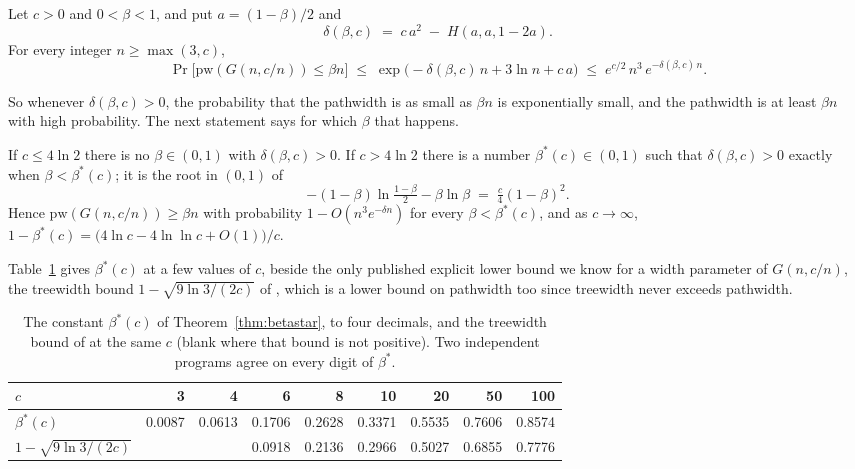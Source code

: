 \begin{theorem}
\label{thm:firstmoment}
Let $c>0$ and $0<\beta<1$, and put $a=(1-\beta)/2$ and
\[
  \delta(\beta,c) \;=\; c\,a^{2} \;-\; H(a,a,1-2a).
\]
For every integer $n\ge\max(3,c)$,
\[
  \Pr\bigl[\mathrm{pw}(G(n,c/n))\le\beta n\bigr]
  \;\le\; \exp\bigl(-\delta(\beta,c)\,n+3\ln n+c\,a\bigr)
  \;\le\; e^{c/2}\,n^{3}\,e^{-\delta(\beta,c)\,n}.
\]
\end{theorem}

So whenever $\delta(\beta,c)>0$, the probability that the pathwidth is as small
as $\beta n$ is exponentially small, and the pathwidth is at least $\beta n$
with high probability. The next statement says for which $\beta$ that happens.

\begin{theorem}
\label{thm:betastar}
If $c\le4\ln2$ there is no $\beta\in(0,1)$ with $\delta(\beta,c)>0$. If
$c>4\ln2$ there is a number $\beta^{*}(c)\in(0,1)$ such that
$\delta(\beta,c)>0$ exactly when $\beta<\beta^{*}(c)$; it is the root in
$(0,1)$ of
\[
  -(1-\beta)\ln\tfrac{1-\beta}{2}-\beta\ln\beta \;=\; \tfrac{c}{4}(1-\beta)^{2}.
\]
Hence $\mathrm{pw}(G(n,c/n))\ge\beta n$ with probability $1-O(n^{3}e^{-\delta n})$
for every $\beta<\beta^{*}(c)$, and as $c\to\infty$,
$1-\beta^{*}(c)=\bigl(4\ln c-4\ln\ln c+O(1)\bigr)/c$.
\end{theorem}

Table~\ref{tab:betastar} gives $\beta^{*}(c)$ at a few values of $c$, beside the
only published explicit lower bound we know for a width parameter of
$G(n,c/n)$, the treewidth bound $1-\sqrt{9\ln3/(2c)}$ of
\citet{PerarnauSerra2014}, which is a lower bound on pathwidth too since
treewidth never exceeds pathwidth.

\begin{table}[htbp]
\centering
\caption{The constant $\beta^{*}(c)$ of Theorem~\ref{thm:betastar}, to four
decimals, and the treewidth bound of \citet{PerarnauSerra2014} at the same
$c$ (blank where that bound is not positive). Two independent programs agree
on every digit of $\beta^{*}$.}
\label{tab:betastar}
\begin{tabular}{@{}lrrrrrrrr@{}}
\toprule
$c$ & 3 & 4 & 6 & 8 & 10 & 20 & 50 & 100 \\
\midrule
$\beta^{*}(c)$ & 0.0087 & 0.0613 & 0.1706 & 0.2628 & 0.3371 & 0.5535 & 0.7606 & 0.8574 \\
$1-\sqrt{9\ln3/(2c)}$ & & & 0.0918 & 0.2136 & 0.2966 & 0.5027 & 0.6855 & 0.7776 \\
\bottomrule
\end{tabular}
\end{table}

